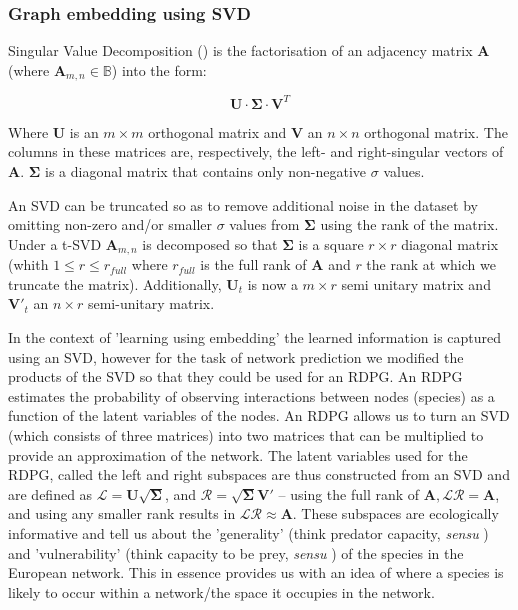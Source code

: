 \begin{refsection}
\subsubsection{Graph embedding using SVD}

Singular Value Decomposition (\cite{Forsythe1967ComSol, Golub1971SinVal}) 
is the factorisation of an adjacency matrix \(\mathbf{A}\) (where
\(\mathbf{A}_{m,n} \in\mathbb{B}\)) into the form:

\[ \mathbf{U}\cdot\mathbf{\Sigma}\cdot\mathbf{V}^T \]

Where \(\mathbf{U}\) is an \(m \times m\) orthogonal matrix and
\(\mathbf{V}\) an \(n \times n\) orthogonal matrix. The columns in these
matrices are, respectively, the left- and right-singular vectors of
\(\mathbf{A}\). \(\mathbf{\Sigma}\) is a diagonal matrix that contains
only non-negative \(\sigma\) values.
 
An SVD can be truncated so as to remove additional noise in the dataset by
omitting non-zero and/or smaller \(\sigma\) values from
\(\mathbf{\Sigma}\) using the rank of the matrix. Under a t-SVD
\(\mathbf{A}_{m,n}\) is decomposed so that \(\mathbf{\Sigma}\) is a
square \(r \times r\) diagonal matrix (whith \(1 \le r \le r_{full}\)
where \(r_{full}\) is the full rank of \(\mathbf{A}\) and \(r\) the rank
at which we truncate the matrix). Additionally, \(\mathbf{U}_{t}\) is now a
\(m \times r\) semi unitary matrix and \(\mathbf{V}'_{t}\) an \(n \times r\)
semi-unitary matrix.

In the context of 'learning using embedding' the learned information is captured using an SVD, however for the task of network prediction we modified the products of the SVD so that they could be used for an RDPG. An RDPG  estimates the probability of observing interactions between nodes (species) as a function of the latent variables of the nodes. An RDPG allows us to turn an SVD (which consists of three matrices) into two matrices that can be multiplied to provide an approximation of the network. The latent variables used for the RDPG, called the left and right subspaces are thus constructed from an SVD and are defined as $\mathscr{L} = \mathbf{U}\sqrt{\mathbf{\Sigma}}$, and $\mathscr{R} = \sqrt{\mathbf{\Sigma}}\mathbf{V}'$ -- using the full rank of $\mathbf{A}, \mathscr{L}\mathscr{R} = \mathbf{A}$, and using any smaller rank results in $\mathscr{L}\mathscr{R} \approx \mathbf{A}$. These subspaces are ecologically informative and tell us about the 'generality' (think predator capacity, \emph{sensu} \cite{Schoener1989Food}) and  'vulnerability' (think capacity to be prey, \emph{sensu} \cite{Schoener1989Food}) of the species in the European network. This in essence provides us with an idea of where a species is likely to occur within a network/the space it occupies in the network.


\end{refsection}
